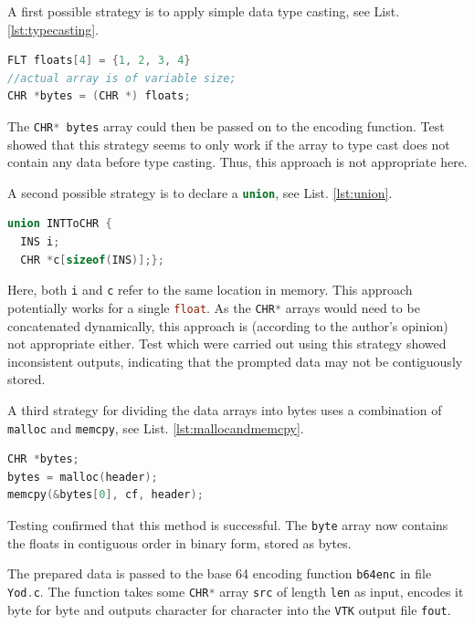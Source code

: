 A first possible strategy is to apply simple data type casting, see List. \ref{lst:typecasting}.

\begin{lstlisting}[language=C, caption=Segmentation approach via type casting with pointers, label=lst:typecasting]
FLT floats[4] = {1, 2, 3, 4}
//actual array is of variable size;
CHR *bytes = (CHR *) floats;
\end{lstlisting}

The \lstinline[language=C]{CHR* bytes} array could then be passed on to the encoding function. Test showed that this strategy seems to only work if the array to type cast does not contain any data before type casting. Thus, this approach is not appropriate here.

\bigbreak
A second possible strategy is to declare a \lstinline[language=C]{union}, see List. \ref{lst:union}.

\begin{lstlisting}[language=C, caption=Segmentation approach via a union, label=lst:union]
union INTToCHR {
  INS i;
  CHR *c[sizeof(INS)];};
\end{lstlisting}

Here, both \lstinline[language=C]{i} and \lstinline[language=C]{c} refer to the same location in memory. This approach potentially works for a single \lstinline[language=C]{float}. As the \lstinline[language=C]{CHR*} arrays would need to be concatenated dynamically, this approach is (according to the author's opinion) not appropriate either. Test which were carried out using this strategy showed inconsistent outputs, indicating that the prompted data may not be contiguously stored.

\bigbreak
A third strategy for dividing the data arrays into bytes uses a combination of \lstinline[language=C]{malloc} and \lstinline[language=C]{memcpy}, see List. \ref{lst:mallocandmemcpy}.

\begin{lstlisting}[language=C, caption=Segmentation approach via memcpy, label=lst:mallocandmemcpy]
CHR *bytes;
bytes = malloc(header);
memcpy(&bytes[0], cf, header);
\end{lstlisting}

Testing confirmed that this method is successful. The \lstinline[language=C]{byte} array now contains the floats in contiguous order in binary form, stored as bytes. 

\bigbreak
The prepared data is passed to the base 64 encoding function \lstinline[language=C]{b64enc} in file \lstinline[language=C]{Yod.c}. The function takes some \lstinline[language=C]{CHR*} array \lstinline[language=C]{src} of length \lstinline[language=C]{len} as input, encodes it byte for byte and outputs character for character into the \texttt{VTK} output file \lstinline[language=C]{fout}. 

